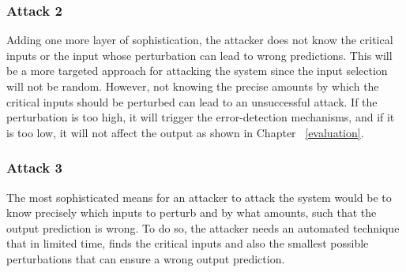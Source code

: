 \subsubsection{Attack 2}
Adding one more layer of sophistication, the attacker does not
know the critical inputs or the input whose perturbation can lead to wrong predictions.
 This will be a more targeted approach for attacking the system since the input selection will not be random. 
However, not knowing the precise amounts by which the critical inputs should be perturbed can lead to an unsuccessful attack. 
If the perturbation is too high, it will trigger the error-detection mechanisms, 
and if it is too low, it will not affect the output as shown in Chapter ~\ref{evaluation}. 

\subsubsection{Attack 3}
The most sophisticated means for an attacker to attack the system would be to know precisely which inputs to perturb and by what amounts,
 such that the output prediction is wrong. 
To do so, the attacker needs an automated technique that in limited time, finds the critical inputs
 and also the smallest possible perturbations that can ensure a wrong output prediction. 
















